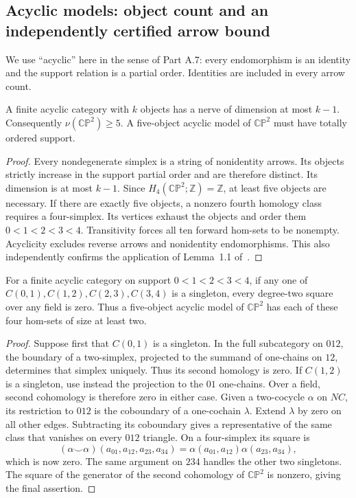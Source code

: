 \subsection{Acyclic models: object count and an independently certified arrow bound}

We use ``acyclic'' here in the sense of Part A.7: every endomorphism
is an identity and the support relation is a partial order. Identities
are included in every arrow count.

\begin{proposition}[Proved]\label{A7:dimension-chain}
A finite acyclic category with $k$ objects has a nerve of dimension
at most $k-1$. Consequently $\nu(\mathbb{CP}^2)\ge5$. A five-object
acyclic model of $\mathbb{CP}^2$ must have totally ordered support.
\end{proposition}
\begin{proof}
Every nondegenerate simplex is a string of nonidentity arrows. Its
objects strictly increase in the support partial order and are
therefore distinct. Its dimension is at most $k-1$. Since
$H_4(\mathbb{CP}^2;\mathbb Z)=\mathbb Z$, at least five objects are
necessary. If there are exactly five objects, a nonzero fourth
homology class requires a four-simplex. Its vertices exhaust the
objects and order them $0<1<2<3<4$. Transitivity forces all ten
forward hom-sets to be nonempty. Acyclicity excludes reverse arrows
and nonidentity endomorphisms. This also independently confirms the
application of Lemma~1.1 of~\cite{CP2-Carcacia2026}.
\end{proof}

\begin{proposition}[Proved]\label{A7:adjacent-homs}
For a finite acyclic category on support $0<1<2<3<4$, if any one
of $C(0,1),C(1,2),C(2,3),C(3,4)$ is a singleton, every degree-two
square over any field is zero. Thus a five-object acyclic model
of $\mathbb{CP}^2$ has each of these four hom-sets of size at least two.
\end{proposition}
\begin{proof}
Suppose first that $C(0,1)$ is a singleton. In the full subcategory
on $012$, the boundary of a two-simplex, projected to the summand
of one-chains on $12$, determines that simplex uniquely. Thus its
second homology is zero. If $C(1,2)$ is a singleton, use instead
the projection to the $01$ one-chains. Over a field, second
cohomology is therefore zero in either case. Given a two-cocycle
$\alpha$ on $NC$, its restriction to $012$ is the coboundary of a
one-cochain $\lambda$. Extend $\lambda$ by zero on all other edges.
Subtracting its coboundary gives a representative of the same class
that vanishes on every $012$ triangle. On a four-simplex its square
is
\[
 (\alpha\smile\alpha)(a_{01},a_{12},a_{23},a_{34})
 =\alpha(a_{01},a_{12})\alpha(a_{23},a_{34}),
\]
which is now zero. The same argument on $234$ handles the other two
singletons. The square of the generator of the second cohomology
of $\mathbb{CP}^2$ is nonzero, giving the final assertion.
\end{proof}

